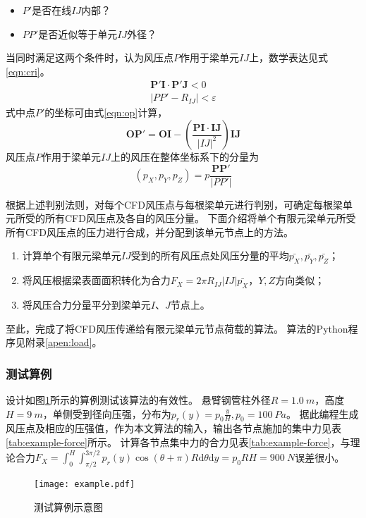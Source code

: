 \begin{itemize}
	\item $P'$是否在线$IJ$内部？
	\item $PP'$是否近似等于单元$IJ$外径？
\end{itemize}
当同时满足这两个条件时，认为风压点$P$作用于梁单元$IJ$上，数学表达见式\eqref{eqn:cri}。
\begin{gather}\label{eqn:cri}
	\bm{P'I}\cdot\bm{P'J} < 0  \nonumber \\
	|PP'-R_{IJ}| < \varepsilon
\end{gather}
式中点$P'$的坐标可由式\eqref{eqn:op}计算，
\begin{equation}\label{eqn:op}
	\bm{OP'}=\bm{OI} - \left( \frac{\bm{PI}\cdot\bm{IJ}}{|IJ|^2} \right)\bm{IJ}
\end{equation}
风压点$P$作用于梁单元$IJ$上的风压在整体坐标系下的分量为
\begin{equation}
	(p_X, p_Y, p_Z) = p\frac{\bm{PP'}}{|PP'|}
\end{equation}

根据上述判别法则，对每个CFD风压点与每根梁单元进行判别，可确定每根梁单元所受的所有CFD风压点及各自的风压分量。
下面介绍将单个有限元梁单元所受所有CFD风压点的压力进行合成，并分配到该单元节点上的方法。
\begin{enumerate}
	\item 计算单个有限元梁单元$IJ$受到的所有风压点处风压分量的平均$\bar{p_X},\bar{p_Y},\bar{p_Z}$；
	\item 将风压根据梁表面面积转化为合力$F_X=2\pi R_{IJ} |IJ| \bar{p_X}$，$Y,Z$方向类似；
	\item 将风压合力分量平分到梁单元$I$、$J$节点上。
\end{enumerate}
至此，完成了将CFD风压传递给有限元梁单元节点荷载的算法。
算法的Python程序见附录\ref{apen:load}。

\subsubsection{测试算例}
设计如图\ref{fig:example}所示的算例测试该算法的有效性。
悬臂钢管柱外径$R=\SI{1.0}{m}$，高度$H=\SI{9}{m}$，单侧受到径向压强，分布为$p_r(y)=p_0\frac{y}{H},p_0=\SI{100}{Pa}$。
据此编程生成风压点及相应的压强值，作为本文算法的输入，输出各节点施加的集中力见表\ref{tab:example-force}所示。
计算各节点集中力的合力见表\ref{tab:example-force}，与理论合力$F_X = \int_{0}^{H}\int_{\pi/2}^{3\pi/2}p_r(y)\cos(\theta+\pi)R \mathrm{d} \theta \mathrm{d} y = p_0 RH=\SI{900}{N}$误差很小。

\begin{figure}[!htbp]
	\centering
	\texttt{[image: example.pdf]}
	\caption{测试算例示意图}
	\label{fig:example}
\end{figure}

